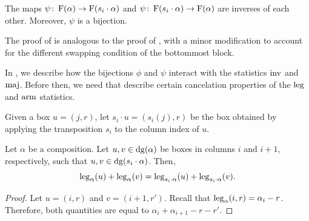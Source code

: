\begin{proposition} \label{prop:psi-inverse}
    The maps \(\psi \colon \Fill(\alpha) \to \Fill(s_i \permact \alpha)\) and \(\psi \colon \Fill(s_i \permact \alpha) \to \Fill(\alpha)\) are inverses of each other.
    Moreover, \(\psi\) is a bijection.
\end{proposition}

The proof of  is analogous to the proof of , with a minor modification to account for the different swapping condition of the bottommost block.

In , we describe how the bijections \(\phi\) and \(\psi\) interact with the statistics \(\inv\) and \(\maj\).
Before then, we need  that describe certain cancelation properties of the \(\operatorname{leg}\) and \(\operatorname{arm}\) statistics.

Given a box \(u = (j, r)\), let \(s_i \cdot u = (s_i(j), r)\) be the box obtained by applying the transposition \(s_i\) to the column index of \(u\).

\begin{lemma} \label{lem:leg-cancelation}
    Let \(\alpha\) be a composition.
    Let \(u, v \in \dg(\alpha)\) be boxes in columns \(i\) and \(i+1\), respectively, such that \(u, v \in \dg(s_i \permact \alpha)\).
    Then,
    \begin{equation*}
        \operatorname{leg}_{\alpha}(u) + \operatorname{leg}_{\alpha}(v)
        =
        \operatorname{leg}_{s_i \cdot \alpha}(u) + \operatorname{leg}_{s_i \cdot \alpha}(v).
    \end{equation*}
\end{lemma}
\begin{proof}
    Let \(u = (i, r)\) and \(v = (i+1, r')\).
    Recall that \( \operatorname{leg}_{\alpha}(i, r) = \alpha_i - r \).
    Therefore, both quantities are equal to \( \alpha_i + \alpha_{i+1} - r - r'. \)
\end{proof}

